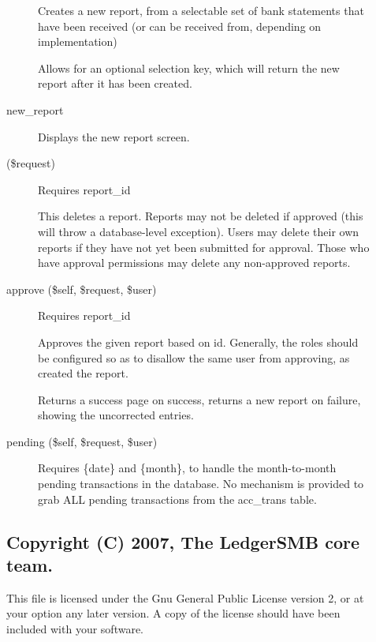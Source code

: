 \begin{description}
\begin{description}
Creates a new report, from a selectable set of bank statements that have been
received (or can be received from, depending on implementation)



Allows for an optional selection key, which will return the new report after
it has been created.


\item[{new\_report}] \mbox{}

Displays the new report screen.


\item[{(\$request)}] \mbox{}

Requires report\_id



This deletes a report.  Reports may not be deleted if approved (this will throw
a database-level exception).  Users may delete their own reports if they have
not yet been submitted for approval.  Those who have approval permissions may 
delete any non-approved reports.


\item[{approve (\$self, \$request, \$user)}] \mbox{}

Requires report\_id



Approves the given report based on id. Generally, the roles should be 
configured so as to disallow the same user from approving, as created the report.



Returns a success page on success, returns a new report on failure, showing 
the uncorrected entries.


\item[{pending (\$self, \$request, \$user)}] \mbox{}

Requires \{date\} and \{month\}, to handle the month-to-month pending transactions
in the database. No mechanism is provided to grab ALL pending transactions 
from the acc\_trans table.

\end{description}
\subsection*{Copyright (C) 2007, The LedgerSMB core team.\label{LedgerSMB::Scripts::recon_Copyright_C_2007_The_LedgerSMB_core_team_}}


This file is licensed under the Gnu General Public License version 2, or at your
option any later version.  A copy of the license should have been included with
your software.


\end{description}
